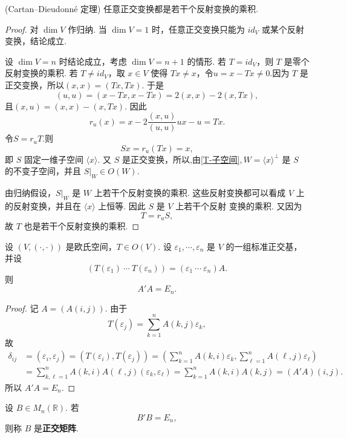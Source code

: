 \begin{proposition}
	(Cartan--Dieudonn\'e 定理)
	任意正交变换都是若干个反射变换的乘积.
\end{proposition}
\begin{proof}
	 对 $\dim V$ 作归纳.
	当 $\dim V=1$ 时，任意正交变换只能为 $id_V$ 或某个反射变换，结论成立.
	
	设 $\dim V=n$ 时结论成立，考虑 $\dim V=n+1$ 的情形.
	若 $T=id_V$，则 $T$ 是零个反射变换的乘积. 若 $T\neq id_V$，取 $x\in V$ 使得
	$Tx\neq x$，令$u=x-Tx\neq 0. $因为 $T$ 是正交变换，所以$(x,x)=(Tx,Tx).$
	于是
	\[
	(u,u)=(x-Tx,x-Tx)=2(x,x)-2(x,Tx),
	\]
	且$(x,u)=(x,x)-(x,Tx). $
	因此
	\[
	r_u(x)=x-2\frac{(x,u)}{(u,u)}ux-u=
	Tx.\]
	令$S=r_uT. $则
	\[
	Sx=r_u(Tx)=x,
	\]
	即 $S$ 固定一维子空间 $\langle x\rangle$.
	又 $S$ 是正交变换，所以,由\ref{T-子空间}$, W=\langle x\rangle^\perp$
	是 $S$ 的不变子空间，并且 $S|_W\in O(W)$.
	
	由归纳假设，$S|_W$ 是 $W$ 上若干个反射变换的乘积. 这些反射变换都可以看成
	$V$ 上的反射变换，并且在 $\langle x\rangle$ 上恒等. 因此 $S$ 是 $V$ 上若干个反射
	变换的乘积. 又因为
	\[
	T=r_uS,
	\]
	故 $T$ 也是若干个反射变换的乘积.
	
\end{proof}
\begin{example}
	设 $(V,(\cdot,\cdot))$ 是欧氏空间，$T\in O(V)$. 设 $\varepsilon_1,\cdots,\varepsilon_n$ 是 $V$ 的一组标准正交基，并设
	\[
	(T(\varepsilon_1)\ \cdots\ T(\varepsilon_n))=(\varepsilon_1\ \cdots\ \varepsilon_n)A.
	\]
	则
	\[
	A'A=E_n.
	\]
\end{example}
\begin{proof}
	记 $A=(A(i,j))$. 由于
	\[
	T(\varepsilon_j)=\sum_{k=1}^{n}A(k,j)\varepsilon_k,
	\]
	故
	\[
	\begin{aligned}
		\delta_{ij}
		&=(\varepsilon_i,\varepsilon_j)=(T(\varepsilon_i),T(\varepsilon_j))=\left(\sum_{k=1}^{n}A(k,i)\varepsilon_k,
		\sum_{\ell=1}^{n}A(\ell,j)\varepsilon_\ell\right)\\
		&=\sum_{k,\ell=1}^{n}A(k,i)A(\ell,j)(\varepsilon_k,\varepsilon_\ell)
		=\sum_{k=1}^{n}A(k,i)A(k,j)=(A'A)(i,j).
	\end{aligned}
	\]
	所以 $A'A=E_n$.
\end{proof}

\begin{definition}\label{p1:concept:c6-l981}
	设 $B\in M_n(\mathbb{R})$. 若
	\[
	B'B=E_n,
	\]
	则称 $B$ 是\textbf{正交矩阵}.
\end{definition}

